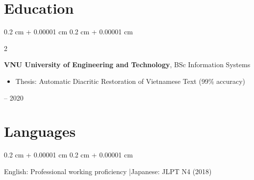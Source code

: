 \documentclass[10pt, letterpaper]{article}
\newenvironment{highlights}{
    \begin{itemize}[
        topsep=0.10 cm,
        parsep=0.10 cm,
        partopsep=0pt,
        itemsep=0pt,
        leftmargin=0.4 cm + 10pt
    ]
    }{
    \end{itemize}
} %
\newenvironment{onecolentry}{
    \begin{adjustwidth}{
        0.2 cm + 0.00001 cm
    }{
        0.2 cm + 0.00001 cm
    }
    }{
    \end{adjustwidth}
} %
\newenvironment{twocolentry}[2][]{
    \onecolentry
    \def\secondColumn{#2}
    \setcolumnwidth{\fill, 4.5 cm}
    \begin{paracol}{2}
    }{
        \switchcolumn \raggedleft \secondColumn
    \end{paracol}
    \endonecolentry
} %
\begin{document}
    \section{Education}
    \begin{twocolentry}{
        2016 -- 2020
    }
        \textbf{VNU University of Engineering and Technology}, BSc Information Systems
        \begin{highlights}
            \item Thesis: Automatic Diacritic Restoration of Vietnamese Text (99\% accuracy)
        \end{highlights}
    \end{twocolentry}

    \section{Languages}
    \begin{onecolentry}
        English: Professional working proficiency \quad|\quad Japanese: JLPT N4 (2018)
    \end{onecolentry}

\end{document}
